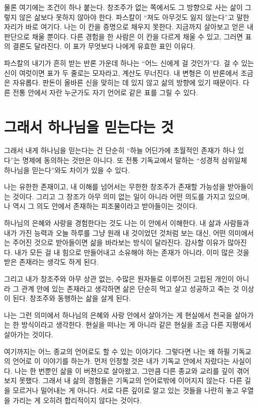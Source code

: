 \documentclass[11pt]{article}
\begin{document}
물론 여기에는 조건이 하나 붙는다. 창조주가 없는 쪽에서도 그 방향으로 사는 삶이
그렇지 않은 삶보다 못하지 않아야 한다. 파스칼이 “져도 아무것도 잃지 않는다”고
말한 자리가 바로 여기다. 나는 이 칸을 증명으로 채우지 못한다. 지금까지 살아보고
얻은 내 판단으로 채울 뿐이다. 다른 경험을 한 사람은 이 칸을 다르게 채울 수 있고,
그러면 표의 결론도 달라진다. 이 표가 무엇보다 나에게 유효한 표인 이유다.

파스칼의 내기가 흔히 받는 반론 가운데 하나는 “어느 신에게 걸 것인가”다. 걸 수
있는 신이 여럿이면 표가 두 줄로는 모자라고, 계산도 무너진다. 내 변형은 이 반론에서
조금은 자유롭다. 판돈이 올바른 신을 맞히는 데 있지 않고 삶의 방향에 있기 때문이다.
다른 전통 안에서 자란 누군가도 자기 언어로 같은 표를 그릴 수 있다.

\section{그래서 하나님을 믿는다는 것}

그래서 내게 하나님을 믿는다는 건 단순히 “하늘 어딘가에 초월적인 존재가 하나
있다”는 명제에 동의하는 것만은 아니다. 또 전통 기독교에서 말하는 “성경적
삼위일체 하나님을 믿는다”와도 차이가 있을 수 있다.

나는 유한한 존재이고, 내 이해를 넘어서는 무한한 창조주가 존재할 가능성을
받아들이는 것이다. 그리고 그 창조가 아무 의미 없는 일이 아니라 어떤 의도를
가지고 있으며, 나 역시 그 의도 안에서 존재하는 피조물이라고 받아들이는 것이다.

하나님의 은혜와 사랑을 경험한다는 것도 나는 이 안에서 이해한다. 내 삶과
사람들과 내가 가진 능력과 오늘 하루를 그냥 원래 내 것이었던 것처럼 보는 대신,
어떤 의미에서는 주어진 것으로 받아들이면 삶을 바라보는 방식이 달라진다. 감사할
이유가 많아진다. 내가 모든 걸 내 힘으로 만들어내고 소유해야 하는 존재가 아니라,
이미 많은 것을 받은 존재라는 생각도 하게 된다.

그리고 내가 창조주와 아무 상관 없는, 수많은 원자들로 이루어진 고립된 개인이
아니라 그 관계 안에 있는 존재라고 생각하면 삶은 단순히 먹고 살고 성공하고 죽는
것 이상이 된다. 창조주와 동행하는 삶을 살게 된다.

나는 그런 의미에서 하나님의 은혜와 사랑 안에서 살아가는 게 현실에서 천국을
살아가는 한 방식이라고 생각한다. 현실을 떠나는 게 아니라 같은 현실을 조금 다른
지평에서 살아가는 것이다.

여기까지는 어느 종교의 언어로도 할 수 있는 이야기다. 그렇다면 나는 왜 하필
기독교의 언어로 이 이야기를 하는가. 먼저 인정할 것은 내가 기독교 안에서
자랐다는 사실이다. 나는 한 번뿐인 삶을 이 버젼으로 살아왔고, 그만큼 다른
종교와 교리를 깊이 겪어보지 못했다. 그래서 내 삶의 경험들은 기독교의
언어로밖에 이어지지 않는다. 다른 길을 모르거나 밀어내는 게 아니다. 서로 다른
깊이로 알고 있는 것들을 나란히 놓고 우열을 가리는 게 오히려 합리적이지 않다는
것이다.
\end{document}
